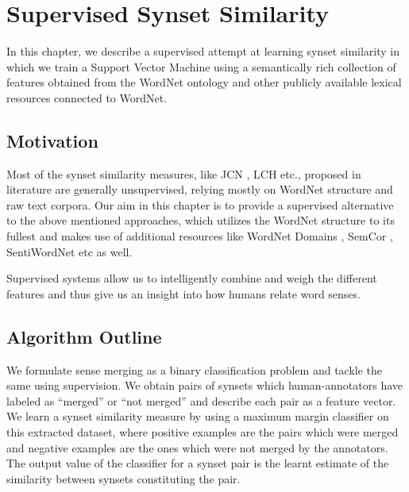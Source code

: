 \chapter{Supervised Synset Similarity}
\label{chapter:SupervisedSynsetSimilarity}
In this chapter, we describe a supervised attempt at learning synset similarity in which we train a Support Vector Machine using a semantically rich collection of features obtained from the WordNet ontology and other publicly available lexical resources connected to WordNet.

\section{Motivation}


Most of the synset similarity measures, like JCN \citep{JCN:1997}, LCH \citep{LCH:1998} etc., proposed in literature are generally unsupervised, relying mostly on WordNet structure and raw text corpora. Our aim in this chapter is to provide a supervised alternative to the above mentioned approaches, which utilizes the WordNet structure to its fullest and makes use of additional resources like WordNet Domains \citep{Gonzalez:XWND}, SemCor \citep{SemCor}, SentiWordNet \citep{Baccianella10sentiwordnet3.0} etc as well. 


Supervised systems allow us to intelligently combine and weigh the different features and thus give us an insight into how humans relate word senses.

\section{Algorithm Outline}
\label{sec:supervisedAlgoOutline}
We formulate sense merging as a binary classification problem and tackle the same using supervision. We obtain pairs of synsets which human-annotators have labeled as ``merged'' or ``not merged'' and describe each pair as a feature vector. We learn a synset similarity measure by using a maximum margin classifier on this extracted dataset, where positive examples are the pairs which were merged and negative examples are the ones which were not merged by the annotators. The output value of the classifier for a synset pair is the learnt estimate of the similarity between synsets constituting the pair.

